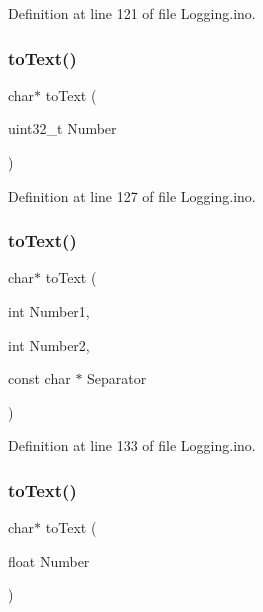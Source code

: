Definition at line 121 of file Logging.\+ino.

\mbox{\label{_logging_8ino_a7cf8a6b4aab3b6b87c07d212a2d7c471}} 
\subsubsection{\texorpdfstring{toText()}{toText()}\hspace{0.1cm}{\footnotesize\ttfamily [2/5]}}
{\footnotesize\ttfamily char$\ast$ to\+Text (\begin{DoxyParamCaption}\item[{uint32\+\_\+t}]{Number }\end{DoxyParamCaption})}



Definition at line 127 of file Logging.\+ino.

\mbox{\label{_logging_8ino_a8f2a6e8caac4689efede55386745032c}} 
\subsubsection{\texorpdfstring{toText()}{toText()}\hspace{0.1cm}{\footnotesize\ttfamily [3/5]}}
{\footnotesize\ttfamily char$\ast$ to\+Text (\begin{DoxyParamCaption}\item[{int}]{Number1,  }\item[{int}]{Number2,  }\item[{const char $\ast$}]{Separator }\end{DoxyParamCaption})}



Definition at line 133 of file Logging.\+ino.

\mbox{\label{_logging_8ino_a4b9899272299200c8b76136aa999a5b1}} 
\subsubsection{\texorpdfstring{toText()}{toText()}\hspace{0.1cm}{\footnotesize\ttfamily [4/5]}}
{\footnotesize\ttfamily char$\ast$ to\+Text (\begin{DoxyParamCaption}\item[{float}]{Number }\end{DoxyParamCaption})}



